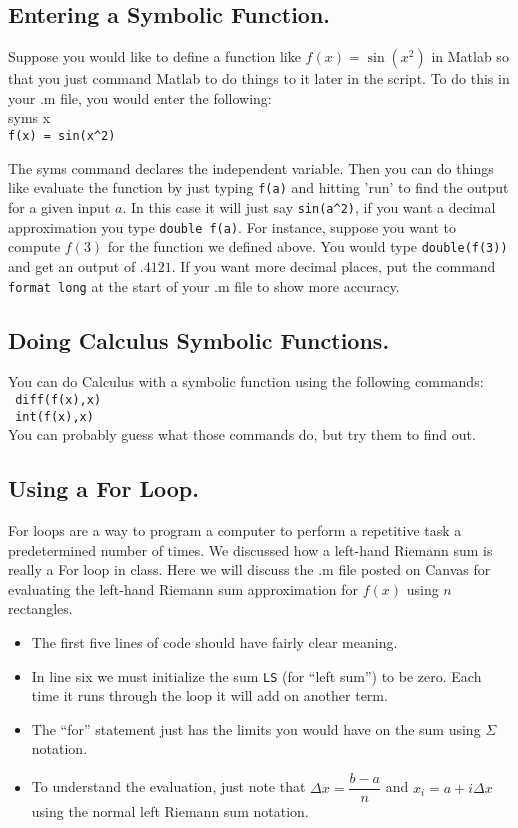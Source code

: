 \documentclass[letterpaper,11pt]{examPTP}
\begin{document}
\pagebreak

\subsection*{Entering a Symbolic Function.}
Suppose you would like to define a function like $f(x) = \sin(x^2)$ in Matlab so that you just command Matlab to do things to it later in the script. To do this in your .m file, you would enter the following:\\

\noindent\ttfamily
syms x\\
\verb!f(x) = sin(x^2) ! \\
\normalfont

The \ttfamily syms \normalfont command declares the independent variable. Then you can do things like evaluate the function by just typing \verb!f(a)! and hitting 'run' to find the output for a given input $a$. In this case it will just say \verb!sin(a^2)!, if you want a decimal approximation you type \verb!double f(a)!. For instance, suppose you want to compute $f(3)$ for the function we defined above. You would type \verb!double(f(3))! and get an output of $.4121$. If you want more decimal places, put the command \verb! format long! at the start of your .m file to show more accuracy.


\subsection*{Doing Calculus Symbolic Functions.}
You can do Calculus with a symbolic function using the following commands:\\

\noindent\verb! diff(f(x),x)! \\
\verb! int(f(x),x)!\\

\noindent You can probably guess what those commands do, but try them to find out. 

\subsection*{Using a For Loop.}
For loops are a way to program a computer to perform a repetitive task a predetermined number of times. We discussed how a left-hand Riemann sum is really a For loop in class. Here we will discuss the .m file posted on Canvas for evaluating the left-hand Riemann sum approximation for $f(x)$ using $n$ rectangles. 
\begin{itemize}
\item The first five lines of code should have fairly clear meaning.
\item In line six we must initialize the sum \verb!LS! (for ``left sum'') to be zero. Each time it runs through the loop it will add on another term.
\item The ``for'' statement just has the limits you would have on the sum using $\Sigma$ notation.
\item To understand the evaluation, just note that $\Delta x = \dfrac{b-a}{n}$ and $x_i = a + i\Delta x$ using the normal left Riemann sum notation.
\end{itemize}
\end{document}
